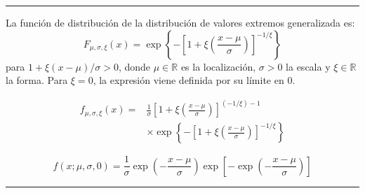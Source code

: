 \begin{f}
\begin{center}
\end{center}



\end{f}
\hrule

\begin{f}
	La función de distribución de la distribución de valores extremos generalizada es:
	\[
	F_{\mu,\sigma,\xi}(x) = \exp\left\{-\left[1+\xi\left(\frac{x-\mu}{\sigma}\right)\right]^{-1/\xi}\right\}
	\]
	para \(1+\xi(x-\mu)/\sigma>0\), donde \(\mu\in\mathbb{R}\) es la localización, \(\sigma>0\) la escala y  \(\xi\in\mathbb{R}\) la forma. Para \(\xi = 0\), la expresión viene definida por su límite en 0.

\begin{align*}
	f_{\mu,\sigma,\xi}(x) =& \frac{1}{\sigma}\left[1+\xi\left(\frac{x-\mu}{\sigma}\right)\right]^{(-1/\xi)-1}\\ &\times\exp\left\{-\left[1+\xi\left(\frac{x-\mu}{\sigma}\right)\right]^{-1/\xi}\right\}
\end{align*}

\[
f(x;\mu ,\sigma ,0)={\frac {1}{\sigma }}\exp \left(-{\frac {x-\mu }{\sigma }}\right)\exp \left[-\exp \left(-{\frac {x-\mu }{\sigma }}\right)\right]
\]

\end{f}
\hrule



